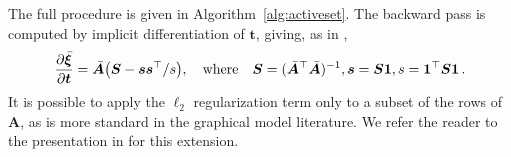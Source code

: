 The full procedure is given in Algorithm~\ref{alg:activeset}.
The backward pass is computed by implicit differentiation of  \wrt
$\bm{t}$, giving, as in \cite{sparsemap},
\begin{equation}
    \frac{\partial \bar{\bm{\xi}}}{\partial \bm{t}} = \bar{\bm{A}}\big(\bm{S} - \bm{ss}^\top / s\big),
    \quad\text{where}\quad
    \bm{S} = (\bar{\bm{A}}^\top \bar{\bm{A}})^{-1},
    \bm{s} = \bm{S1}, s = \bm{1}^\top\bm{S1}
    \,.
\end{equation}
It is possible to apply the $\ell_2$ regularization term only to a subset of the
rows of $\bm{A}$, as is more standard in the graphical model literature. We
refer the reader to the presentation in \cite{ad3,sparsemap} for this extension.
